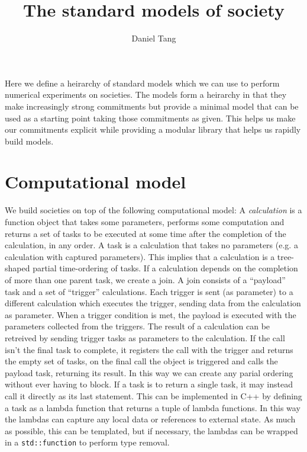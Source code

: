 \documentclass[a4paper]{article}
\title{The standard models of society}
\author{Daniel Tang}
\begin{document}
\maketitle

Here we define a heirarchy of standard models which we can use to perform numerical experiments on societies. The models form a heirarchy in that they make increasingly strong commitments but provide a minimal model that can be used as a starting point taking those commitments as given. This helps us make our commitments explicit while providing a modular library that helps us rapidly build models.

\section{Computational model}

We build societies on top of the following computational model: A \textit{calculation} is a function object that takes some parameters, performs some computation and returns a set of tasks to be executed at some time after the completion of the calculation, in any order. A task is a calculation that takes no parameters (e.g. a calculation with captured parameters). This implies that a calculation is a tree-shaped partial time-ordering of tasks. If a calculation depends on the completion of more than one parent task, we create a join. A join consists of a ``payload'' task and a set of ``trigger'' calculations. Each trigger is sent (as parameter) to a different calculation which executes the trigger, sending data from the calculation as parameter. When a trigger condition is met, the payload is executed with the parameters collected from the triggers. The result of a calculation can be retreived by sending trigger tasks as parameters to the calculation. If the call isn't the final task to complete, it registers the call with the trigger and returns the empty set of tasks, on the final call the object is triggered and calls the payload task, returning its result. In this way we can create any parial ordering without ever having to block. If a task is to return a single task, it may instead call it directly as its last statement. This can be implemented in C++ by defining a task as a lambda function that returns a tuple of lambda functions. In this way the lambdas can capture any local data or references to external state. As much as possible, this can be templated, but if necessary, the lambdas can be wrapped in a \texttt{std::function} to perform type removal.
\end{document}
